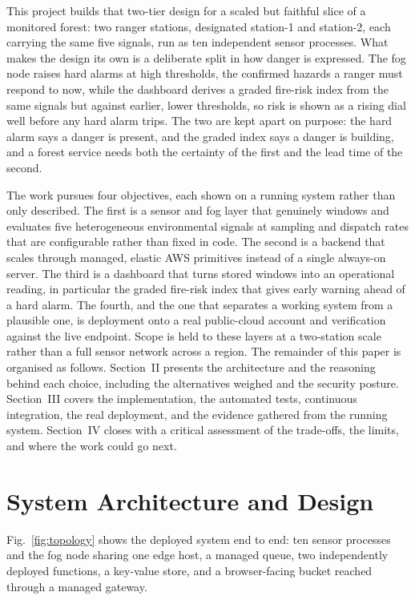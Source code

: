 \documentclass[conference]{IEEEtran}
\begin{document}
This project builds that two-tier design for a scaled but faithful slice of a monitored forest: two ranger stations, designated station-1 and station-2, each carrying the same five signals, run as ten independent sensor processes. What makes the design its own is a deliberate split in how danger is expressed. The fog node raises hard alarms at high thresholds, the confirmed hazards a ranger must respond to now, while the dashboard derives a graded fire-risk index from the same signals but against earlier, lower thresholds, so risk is shown as a rising dial well before any hard alarm trips. The two are kept apart on purpose: the hard alarm says a danger is present, and the graded index says a danger is building, and a forest service needs both the certainty of the first and the lead time of the second.

The work pursues four objectives, each shown on a running system rather than only described. The first is a sensor and fog layer that genuinely windows and evaluates five heterogeneous environmental signals at sampling and dispatch rates that are configurable rather than fixed in code. The second is a backend that scales through managed, elastic AWS primitives instead of a single always-on server. The third is a dashboard that turns stored windows into an operational reading, in particular the graded fire-risk index that gives early warning ahead of a hard alarm. The fourth, and the one that separates a working system from a plausible one, is deployment onto a real public-cloud account and verification against the live endpoint. Scope is held to these layers at a two-station scale rather than a full sensor network across a region. The remainder of this paper is organised as follows. Section~II presents the architecture and the reasoning behind each choice, including the alternatives weighed and the security posture. Section~III covers the implementation, the automated tests, continuous integration, the real deployment, and the evidence gathered from the running system. Section~IV closes with a critical assessment of the trade-offs, the limits, and where the work could go next.

\section{System Architecture and Design}

Fig.~\ref{fig:topology} shows the deployed system end to end: ten sensor processes and the fog node sharing one edge host, a managed queue, two independently deployed functions, a key-value store, and a browser-facing bucket reached through a managed gateway.
\end{document}
